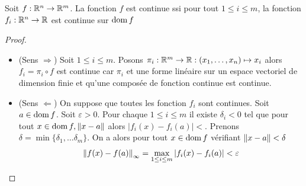      \begin{proposition}
         Soit $f:\mathbb{R}^n\to\mathbb{R}^m$. La fonction $f$ est continue ssi pour tout $1\leq i\leq m$, la fonction $f_i:\mathbb{R}^n\to\mathbb{R}$ est continue sur $\operatorname{dom} f$
     \end{proposition}
     \begin{proof} 
         \begin{itemize}
             \item (Sens $\Rightarrow$) Soit $1\leq i\leq m$. Posons $\pi_i:\mathbb{R}^m\to\mathbb{R} : (x_1,\dots,x_n)\mapsto x_i$ alors $f_i=\pi_i \circ f$ est continue car $\pi_i$ et une forme linéaire sur un espace vectoriel de dimension finie et qu'une composée de fonction continue est continue.
             \item (Sens $\Leftarrow$) On suppose que toutes les fonction $f_i$ sont continues. Soit $a\in\operatorname{dom} f$. Soit $\varepsilon>0$. Pour chaque $1\leq i\leq m$ il existe $\delta_i<0$ tel que pour tout $x\in\operatorname{dom} f,\left\| x-a \right\|$ alors $|f_i(x)-f_i(a)|<$. Prenons $\delta = \min\{\delta_
             1,\dots\delta_m\}$. On a alors pour tout $x\in\operatorname{dom} f$ vérifiant $\left\| x-a \right\|<\delta$
             $$\left\| f(x)-f(a) \right\|_\infty = \max_{1\leq i\leq m}|f_i(x)-f_i(a)|<\varepsilon$$
         \end{itemize}
     \end{proof}